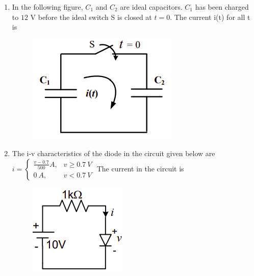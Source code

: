 \documentclass[journal,12pt,onecolumn]{IEEEtran}
\theoremstyle{remark}
\begin{document}
\begin{enumerate}[start=1, label=Q.\arabic*]
\item In the following figure, $C_{1}$ and $C_{2}$ are ideal capacitors. $C_{1}$ has been charged to $12$ V before the ideal switch S is closed at $t=0$. The current i(t) for all t is
\begin{figure}[H]
    \centering
    \includegraphics[width=0.3\columnwidth]{Figures/q17.png}
    \caption{}
\end{figure}

\begin{enumerate}
\end{enumerate}
\hfill{}

\item The i-v characteristics of the diode in the circuit given below are
$i=\begin{cases}\frac{v-0.7}{500}A, & v\ge0.7~V\\ 0~A, & v<0.7~V\end{cases}$
The current in the circuit is
\begin{figure}[H]
    \centering
    \includegraphics[width=0.2\columnwidth]{Figures/q18.png}
    \caption{}
\end{figure}

\begin{enumerate}
\end{enumerate}
\hfill{}


\end{enumerate}
\end{document}
